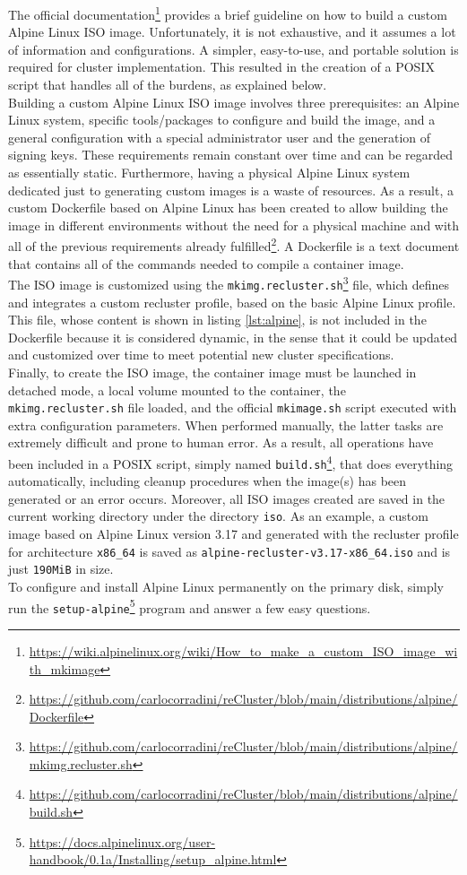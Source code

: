 The official documentation\footnote{\url{https://wiki.alpinelinux.org/wiki/How_to_make_a_custom_ISO_image_with_mkimage}}
provides a brief guideline on how to build a custom Alpine Linux ISO image.
Unfortunately, it is not exhaustive, and it assumes a lot of information and
configurations. A simpler, easy-to-use, and portable solution is required for cluster
implementation. This resulted in the creation of a POSIX script that handles all
of the burdens, as explained below. \\ %
Building a custom Alpine Linux ISO image involves three prerequisites: an Alpine
Linux system, specific tools/packages to configure and build the image, and a
general configuration with a special administrator user and the generation of
signing keys. These requirements remain constant over time and can be regarded as
essentially static. Furthermore, having a physical Alpine Linux system dedicated
just to generating custom images is a waste of resources. As a result, a custom Dockerfile
based on Alpine Linux has been created to allow building the image in different environments
without the need for a physical machine and with all of the previous requirements
already fulfilled\footnote{\url{https://github.com/carlocorradini/reCluster/blob/main/distributions/alpine/Dockerfile}}.
A Dockerfile is a text document that contains all of the commands needed to
compile a container image\cite{dockerfile}. \\ %
The ISO image is customized using the \texttt{mkimg.recluster.sh}\footnote{\url{https://github.com/carlocorradini/reCluster/blob/main/distributions/alpine/mkimg.recluster.sh}}
file, which defines and integrates a custom recluster profile, based on the
basic Alpine Linux profile. This file, whose content is shown in listing
\ref{lst:alpine}, is not included in the Dockerfile because it is considered dynamic,
in the sense that it could be updated and customized over time to meet potential
new cluster specifications. \\ %
Finally, to create the ISO image, the container image must be launched in
detached mode, a local volume mounted to the container, the \texttt{mkimg.recluster.sh}
file loaded, and the official \texttt{mkimage.sh} script executed with extra configuration
parameters. When performed manually, the latter tasks are extremely difficult and
prone to human error. As a result, all operations have been included in a POSIX script,
simply named \texttt{build.sh}\footnote{\url{https://github.com/carlocorradini/reCluster/blob/main/distributions/alpine/build.sh}},
that does everything automatically, including cleanup procedures when the image(s)
has been generated or an error occurs. Moreover, all ISO images created are
saved in the current working directory under the directory \texttt{iso}. As an
example, a custom image based on Alpine Linux version 3.17 and generated with the
recluster profile for architecture \texttt{x86\_64} is saved as \texttt{alpine-recluster-v3.17-x86\_64.iso}
and is just \texttt{190MiB} in size. \\ %
To configure and install Alpine Linux permanently on the primary disk, simply run
the \texttt{setup-alpine}\footnote{\url{https://docs.alpinelinux.org/user-handbook/0.1a/Installing/setup_alpine.html}}
program and answer a few easy questions.

